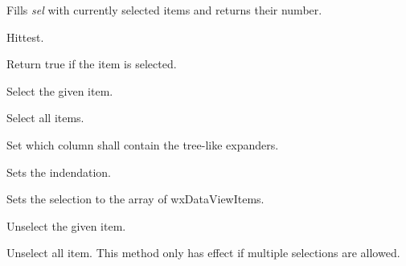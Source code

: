 \label{wxdataviewctrlgetselections}


Fills {\it sel} with currently selected items and returns
their number.

\label{wxdataviewctrlhittest}


Hittest.

\label{wxdataviewctrlisselected}


Return true if the item is selected.

\label{wxdataviewctrlselect}


Select the given item.

\label{wxdataviewctrlselectall}


Select all items.

\label{wxdataviewctrlsetexpandercolumn}


Set which column shall contain the tree-like expanders.

\label{wxdataviewctrlsetindent}


Sets the indendation.

\label{wxdataviewctrlsetselections}


Sets the selection to the array of wxDataViewItems.

\label{wxdataviewctrlunselect}


Unselect the given item.

\label{wxdataviewctrlunselectall}


Unselect all item. This method only has effect if multiple
selections are allowed.

